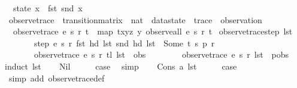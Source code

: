 \begin{isabellebody}
\ \ {\isachardoublequoteopen}state\ x\ {\isasymequiv}\ fst\ {\isacharparenleft}snd\ x{\isacharparenright}{\isachardoublequoteclose}\isanewline
\isanewline
{}\isamarkupfalse%
\ observe{\isacharunderscore}trace\ {\isacharcolon}{\isacharcolon}\ {\isachardoublequoteopen}transition{\isacharunderscore}matrix\ {\isasymRightarrow}\ nat\ {\isasymRightarrow}\ datastate\ {\isasymRightarrow}\ trace\ {\isasymRightarrow}\ observation{\isachardoublequoteclose}\ \isanewline
\ \ {\isachardoublequoteopen}observe{\isacharunderscore}trace\ e\ s\ r\ t\ {\isasymequiv}\ map\ {\isacharparenleft}{\isasymlambda}{\isacharparenleft}t{\isacharcomma}x{\isacharcomma}y{\isacharcomma}z{\isacharparenright}{\isachardot}\ y{\isacharparenright}\ {\isacharparenleft}observe{\isacharunderscore}all\ e\ s\ r\ t{\isacharparenright}{\isachardoublequoteclose}\isanewline
\isanewline
{}\isamarkupfalse%
\ observe{\isacharunderscore}trace{\isacharunderscore}step{\isacharcolon}\ {\isachardoublequoteopen}lst\ {\isasymnoteq}\ {\isacharbrackleft}{\isacharbrackright}\ {\isasymLongrightarrow}\isanewline
\ \ \ \ \ \ \ step\ e\ s\ r\ {\isacharparenleft}fst\ {\isacharparenleft}hd\ lst{\isacharparenright}{\isacharparenright}\ {\isacharparenleft}snd\ {\isacharparenleft}hd\ lst{\isacharparenright}{\isacharparenright}\ {\isacharequal}\ Some\ {\isacharparenleft}t{\isacharcomma}\ s{\isacharprime}{\isacharcomma}\ p{\isacharcomma}\ r{\isacharprime}{\isacharparenright}\ {\isasymLongrightarrow}\isanewline
\ \ \ \ \ \ \ observe{\isacharunderscore}trace\ e\ s{\isacharprime}\ r{\isacharprime}\ {\isacharparenleft}tl\ lst{\isacharparenright}\ {\isacharequal}\ obs\ {\isasymLongrightarrow}\isanewline
\ \ \ \ \ \ \ observe{\isacharunderscore}trace\ e\ s\ r\ lst\ {\isacharequal}\ p{\isacharhash}obs{\isachardoublequoteclose}\isanewline
%
\isadelimproof
%
\endisadelimproof
%
\isatagproof
{}\isamarkupfalse%
{\isacharparenleft}induct\ lst{\isacharparenright}\isanewline
\ \ \isamarkupfalse%
\ Nil\isanewline
\ \ \isamarkupfalse%
\ \isamarkupfalse%
\ {\isacharquery}case\ \isamarkupfalse%
\ simp\isanewline
{}\isamarkupfalse%
\isanewline
\ \ \isamarkupfalse%
\ {\isacharparenleft}Cons\ a\ lst{\isacharparenright}\isanewline
\ \ \isamarkupfalse%
\ \isamarkupfalse%
\ {\isacharquery}case\isanewline
\ \ \ \ \isamarkupfalse%
\ {\isacharparenleft}simp\ add{\isacharcolon}\ observe{\isacharunderscore}trace{\isacharunderscore}def{\isacharparenright}\isanewline

\end{isabellebody}
